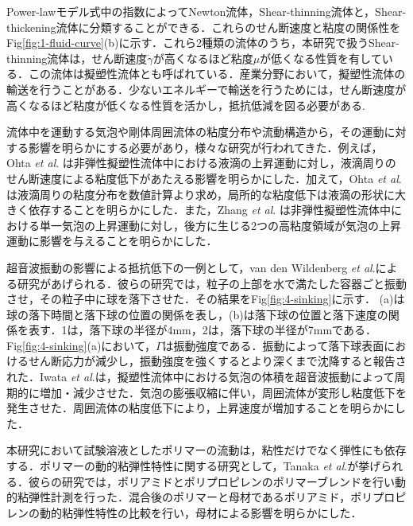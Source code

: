 Power-lawモデル式中の指数によってNewton流体，Shear-thinning流体と，Shear-thickening流体に分類することができる．これらのせん断速度と粘度の関係性をFig\ref{fig:1-fluid-curve}(b)に示す．これら2種類の流体のうち，本研究で扱うShear-thinning流体は，せん断速度$\dot{\gamma}$が高くなるほど粘度$\mu$が低くなる性質を有している．この流体は擬塑性流体とも呼ばれている．産業分野において，擬塑性流体の輸送を行うことがある．少ないエネルギーで輸送を行うためには，せん断速度が高くなるほど粘度が低くなる性質を活かし，抵抗低減を図る必要がある.

流体中を運動する気泡や剛体周囲流体の粘度分布や流動構造から，その運動に対する影響を明らかにする必要があり，様々な研究が行われてきた．例えば，Ohta \textit{et al}. \cite{ref:2}は非弾性擬塑性流体中における液滴の上昇運動に対し，液滴周りのせん断速度による粘度低下があたえる影響を明らかにした．加えて，Ohta \textit{et al}. \cite{ref:3}は液滴周りの粘度分布を数値計算より求め，局所的な粘度低下は液滴の形状に大きく依存することを明らかにした．また，Zhang \textit{et al}. \cite{ref:4}は非弾性擬塑性流体中における単一気泡の上昇運動に対し，後方に生じる2つの高粘度領域が気泡の上昇運動に影響を与えることを明らかにした．

超音波振動の影響による抵抗低下の一例として，van den Wildenberg \textit{et al}.\cite{ref:6}による研究があげられる．彼らの研究では，粒子の上部を水で満たした容器ごと振動させ，その粒子中に球を落下させた．その結果をFig\ref{fig:4-sinking}に示す．
(a)は球の落下時間と落下球の位置の関係を表し，(b)は落下球の位置と落下速度の関係を表す．1は，落下球の半径が4mm，2は，落下球の半径が7mmである．Fig\ref{fig:4-sinking}(a)において，$\Gamma$は振動強度である．振動によって落下球表面におけるせん断応力が減少し，振動強度を強くするとより深くまで沈降すると報告された．Iwata \textit{et al}.\cite{ref:5}は，擬塑性流体中における気泡の体積を超音波振動によって周期的に増加・減少させた．気泡の膨張収縮に伴い，周囲流体が変形し粘度低下を発生させた．周囲流体の粘度低下により，上昇速度が増加することを明らかにした．

本研究において試験溶液としたポリマーの流動は，粘性だけでなく弾性にも依存する\cite{viscoelasticity}．ポリマーの動的粘弾性特性に関する研究として，Tanaka \textit{et al}.\cite{田中勝敏1993ポリアミド}が挙げられる．彼らの研究では，ポリアミドとポリプロピレンのポリマーブレンドを行い動的粘弾性計測を行った．混合後のポリマーと母材であるポリアミド，ポリプロピレンの動的粘弾性特性の比較を行い，母材による影響を明らかにした．


